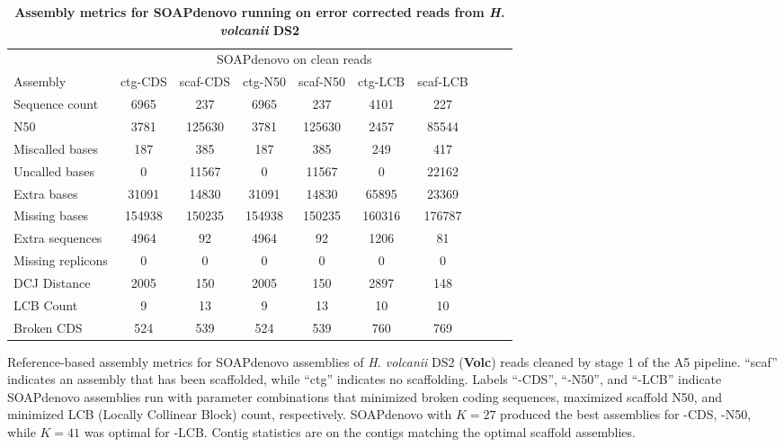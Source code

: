 \documentclass[10pt]{article}
\begin{document}
\begin{table}[hp] 
\caption{ 
\bf{Assembly metrics for SOAPdenovo running on error corrected reads from \textit{H. volcanii} DS2}}
\footnotesize
\begin{tabular}{l|cccccc|ccc}
&\multicolumn{6}{c|}{SOAPdenovo on clean reads} \\
Assembly           & ctg-CDS & scaf-CDS & ctg-N50 & scaf-N50 & ctg-LCB & scaf-LCB \\
Sequence count     & 6965    & 237      & 6965    & 237      & 4101    & 227      \\
N50                & 3781    & 125630   & 3781    & 125630   & 2457    & 85544   \\
Miscalled bases    & 187     & 385      & 187     & 385      & 249     & 417      \\
Uncalled bases     & 0       & 11567    & 0       & 11567    & 0       & 22162    \\
Extra bases        & 31091   & 14830    & 31091   & 14830    & 65895   & 23369    \\
Missing bases      & 154938  & 150235   & 154938  & 150235   & 160316  & 176787   \\
Extra sequences    & 4964    & 92       & 4964    & 92       & 1206    & 81       \\
Missing replicons  & 0       & 0        & 0       & 0        & 0       & 0        \\
DCJ Distance       & 2005    & 150      & 2005    & 150      & 2897    & 148      \\
LCB Count          & 9       & 13       & 9       & 13       & 10      & 10       \\
Broken CDS         & 524     & 539      & 524     & 539      & 760     & 769      \\
\end{tabular}
\begin{flushleft} Reference-based assembly metrics for SOAPdenovo assemblies of \textit{H. volcanii} DS2 
(\textbf{Volc}) reads cleaned by stage 1 of the A5 pipeline. ``scaf'' indicates an assembly that has been scaffolded, while ``ctg'' indicates no scaffolding. 
Labels ``-CDS'', ``-N50'', and ``-LCB'' indicate SOAPdenovo assemblies run with parameter combinations that minimized broken coding 
sequences, maximized scaffold N50, and minimized LCB (Locally Collinear Block) count, respectively.
SOAPdenovo with $K=27$ produced the best assemblies for -CDS, -N50, while $K=41$ was optimal for -LCB. Contig statistics are on the contigs matching the optimal scaffold assemblies.
\end{flushleft}
\label{tab:soapcleanvolc}
\end{table}
\end{document}
